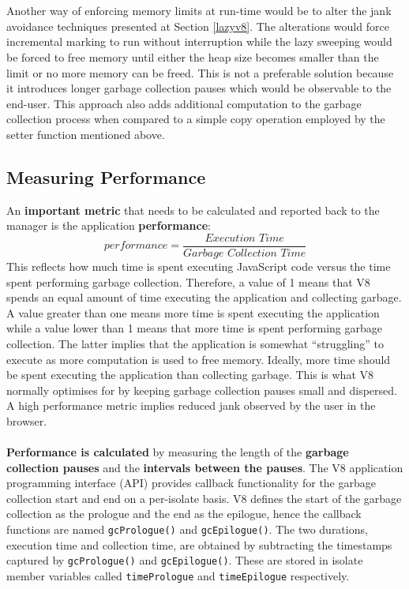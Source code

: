 \documentclass{l4proj}
\begin{document}
\\\\
\hspace*{1em} Another way of enforcing memory limits at run-time would be to alter the jank avoidance techniques presented at Section \ref{lazyv8}. The alterations would force incremental marking to run without interruption while the lazy sweeping would be forced to free memory until either the heap size becomes smaller than the limit or no more memory can be freed. This is not a preferable solution because it introduces longer garbage collection pauses which would be observable to the end-user. This approach also adds additional computation to the garbage collection process when compared to a simple copy operation employed by the setter function mentioned above.
\subsection{Measuring Performance}
\hspace*{1em} An \textbf{important metric} that needs to be calculated and reported back to the manager is the application \textbf{performance}:
\begin{equation}
performance = \frac{\textit{Execution Time}}{\textit{Garbage Collection Time}}
\end{equation}
\hspace*{1em} This reflects how much time is spent executing JavaScript code versus the time spent performing garbage collection. Therefore, a value of 1 means that V8 spends an equal amount of time executing the application and collecting garbage. A value greater than one means more time is spent executing the application while a value lower than 1 means that more time is spent performing garbage collection. The latter implies that the application is somewhat ``struggling'' to execute as more computation is used to free memory. Ideally, more time should be spent executing the application than collecting garbage. This is what V8 normally optimises for by keeping garbage collection pauses small and dispersed. A high performance metric implies reduced jank observed by the user in the browser.
\\\\
\hspace*{1em} \textbf{Performance is calculated} by measuring the length of the \textbf{garbage collection pauses} and the \textbf{intervals between the pauses}. The V8 application programming interface (API) provides callback functionality for the garbage collection start and end on a per-isolate basis. V8 defines the start of the garbage collection as the prologue and the end as the epilogue, hence the callback functions are named \texttt{gcPrologue()} and \texttt{gcEpilogue()}. The two durations, execution time and collection time, are obtained by subtracting the timestamps captured by \texttt{gcPrologue()} and \texttt{gcEpilogue()}. These are stored in isolate member variables called \texttt{timePrologue} and \texttt{timeEpilogue} respectively. 
\end{document}

